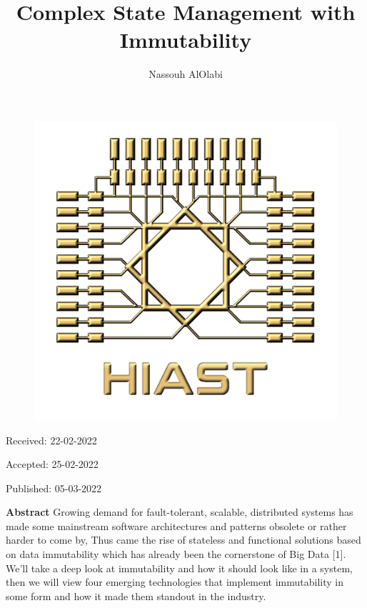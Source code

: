 \documentclass[12pt,twoside]{article}
\title{\Huge{Complex State Management with Immutability}}
\author{Nassouh AlOlabi}
\affil{Scientific supervisor: Dr.Yasser Rahal}
\affil{General supervisor: Dr.Kadan Joumaa}
\affil{Linguistic supervisor: Fahmi Alammareen}
\date{}
\makeatletter
\def\maketitle{{%
		\renewenvironment{tabular}[2][]
		{\begin{flushleft}}
			{\end{flushleft}}
		\AB@maketitle}}
\makeatother
\begin{document}

\begin{figure}
    {\includegraphics[scale=.25]{logo.png}}
\end{figure}

\maketitle

\thispagestyle{first}

\vspace{0.5cm}

\hfill Received: 22-02-2022 

\hfill Accepted: 25-02-2022

\hfill Published: 05-03-2022

\vspace{1cm}


\vspace{1.5cm}
\newpage
\noindent \textbf{Abstract}
\newline\newline
\noindent Growing demand for fault-tolerant, scalable, distributed systems has made some mainstream software architectures and patterns obsolete or rather harder to come by, Thus came the rise of stateless and functional solutions based on data immutability which has already been the cornerstone of Big Data [1]. We'll take a deep look at immutability and how it should look like in a system, then we will view four emerging technologies that implement immutability in some form and how it made them standout in the industry.
\end{document}

